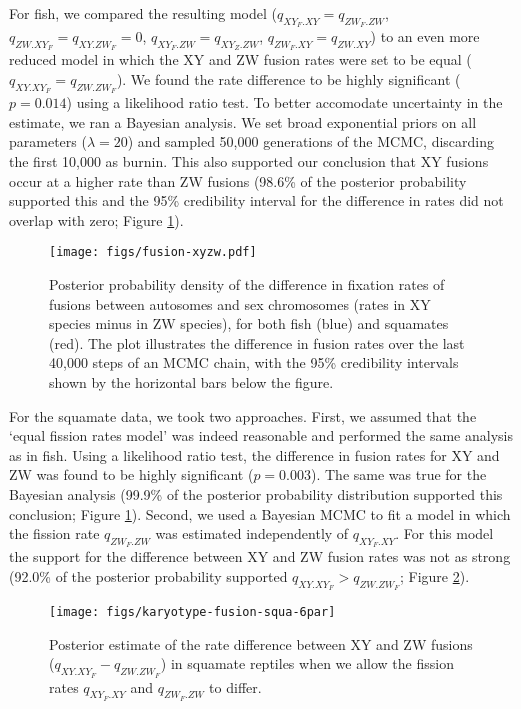 For fish, we compared the resulting model ($q_{XY_F.XY} = q_{ZW_F.ZW}$, $q_{ZW.XY_F}=q_{XY.ZW_F}=\text{0}$, $q_{XY_F.ZW}=q_{XY_Z.ZW}$, $q_{ZW_F.XY}=q_{ZW.XY}$) to an even more reduced model in which the XY and ZW fusion rates were set to be equal ($q_{XY.XY_F}=q_{ZW.ZW_F}$). We found the rate difference to be highly significant ($p=\text{0.014}$) using a likelihood ratio test. To better accomodate uncertainty in the estimate, we ran a Bayesian analysis. We set broad exponential priors on all parameters ($\lambda=\text{20}$) and sampled 50,000 generations of the MCMC, discarding the first 10,000 as burnin. This also supported our conclusion that XY fusions occur at a higher rate than ZW fusions (98.6\% of the posterior probability supported this and the 95\% credibility interval for the difference in rates did not overlap with zero; Figure \ref{fig:pp-fuse-final}).

\begin{figure}
\centering
\texttt{[image: figs/fusion-xyzw.pdf]}
\caption[Fusion rate difference between XY and ZW systems]{Posterior probability density of the difference in fixation rates of fusions between autosomes and sex chromosomes (rates in XY species minus in ZW species), for both fish (blue) and squamates (red). The plot illustrates the difference in fusion rates over the last 40,000 steps of an MCMC chain, with the 95\% credibility intervals shown by the horizontal bars below the figure.}
\label{fig:pp-fuse-final}
\end{figure}

For the squamate data, we took two approaches. First, we assumed that the `equal fission rates model' was indeed reasonable and performed the same analysis as in fish. Using a likelihood ratio test, the difference in fusion rates for XY and ZW was found to be highly significant ($p=\text{0.003}$). The same was true for the Bayesian analysis (99.9\% of the posterior probability distribution supported this conclusion; Figure \ref{fig:pp-fuse-final}). Second, we used a Bayesian MCMC to fit a model in which the fission rate $q_{ZW_F.ZW}$ was estimated independently of $q_{XY_F.XY}$. For this model the support for the difference between XY and ZW fusion rates was not as strong (92.0\% of the posterior probability supported $q_{XY.XY_F} > q_{ZW.ZW_F}$; Figure \ref{fig:squa-dif}).

\begin{figure}[p]
\centering
\texttt{[image: figs/karyotype-fusion-squa-6par]}
\caption[Fusion rate difference between XY and ZW systems (alternate model)]{Posterior estimate of the rate difference between XY and ZW fusions ($q_{XY.XY_F} - q_{ZW.ZW_F}$) in squamate reptiles when we allow the fission rates $q_{XY_F.XY}$ and $q_{ZW_F.ZW}$ to differ.}
\label{fig:squa-dif}
\end{figure}

